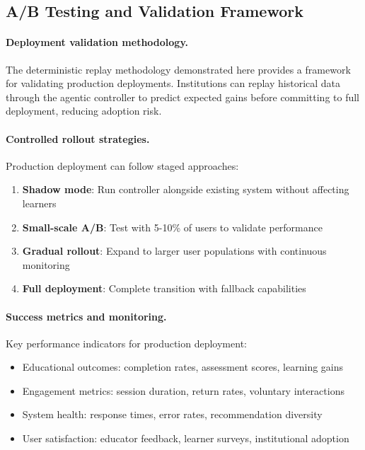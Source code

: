 \subsection{A/B Testing and Validation Framework}
\label{app:ab-testing}

\paragraph{Deployment validation methodology.} The deterministic replay methodology demonstrated here provides a framework for validating production deployments. Institutions can replay historical data through the agentic controller to predict expected gains before committing to full deployment, reducing adoption risk.

\paragraph{Controlled rollout strategies.} Production deployment can follow staged approaches:
\begin{enumerate}
  \item \textbf{Shadow mode}: Run controller alongside existing system without affecting learners
  \item \textbf{Small-scale A/B}: Test with 5-10\% of users to validate performance
  \item \textbf{Gradual rollout}: Expand to larger user populations with continuous monitoring
  \item \textbf{Full deployment}: Complete transition with fallback capabilities
\end{enumerate}

\paragraph{Success metrics and monitoring.} Key performance indicators for production deployment:
\begin{itemize}
  \item Educational outcomes: completion rates, assessment scores, learning gains
  \item Engagement metrics: session duration, return rates, voluntary interactions
  \item System health: response times, error rates, recommendation diversity
  \item User satisfaction: educator feedback, learner surveys, institutional adoption
\end{itemize}

